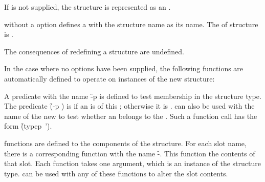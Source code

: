 If  is not supplied,
the structure is represented as an  .


 without a  option defines a  with
the structure name as its name. The  of structure
 is .  

\endlist

The consequences of redefining a  structure are undefined.


In the case where no  options have been supplied, 
the following functions are automatically defined to operate 
on instances of the new structure:

\beginlist
{}

A predicate with the name \f{-p} is defined to
test membership in the structure type.  The predicate 
\f{(-p )} is  if an  
is of this ; otherwise it is .   can also
be used with the name of the new  to test whether an 
belongs to the . 
Such a function call has the form 
\hbox{\f{(typep  ')}}.


 functions are defined to  the components of the
structure.  For each slot name, there is a corresponding
 function with the name \f{-}.
This function  the contents of that slot.  
Each  function takes one argument, which is
an instance of the structure type.  
 can be used with any of these  functions
to alter the slot contents.

